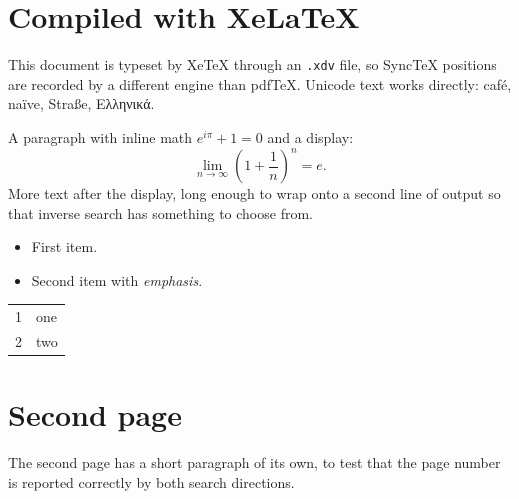 \documentclass[12pt]{article}
\begin{document}
\section{Compiled with XeLaTeX}
This document is typeset by XeTeX through an \texttt{.xdv} file, so
SyncTeX positions are recorded by a different engine than pdfTeX.
Unicode text works directly: café, naïve, Straße, Ελληνικά.

A paragraph with inline math $e^{i\pi} + 1 = 0$ and a display:
\[
  \lim_{n\to\infty} \left(1 + \frac{1}{n}\right)^n = e.
\]
More text after the display, long enough to wrap onto a second line
of output so that inverse search has something to choose from.

\begin{itemize}
  \item First item.
  \item Second item with \emph{emphasis}.
\end{itemize}

\begin{tabular}{rl}
  1 & one \\
  2 & two \\
\end{tabular}

\newpage
\section{Second page}
The second page has a short paragraph of its own, to test that the
page number is reported correctly by both search directions.
\end{document}
